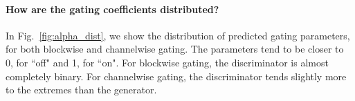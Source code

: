 \paragraph{How are the gating coefficients distributed?} In Fig.~\ref{fig:alpha_dist}, we show the distribution of predicted gating parameters, for both blockwise and channelwise gating. The parameters tend to be closer to 0, for ``off" and 1, for ``on". For blockwise gating, the discriminator is almost completely binary. For channelwise gating, the discriminator tends slightly more to the extremes than the generator.








